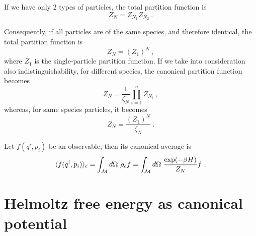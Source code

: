     \begin{example}
        If we have only $2$ types of particles, the total partition function is 
        \begin{equation*}
            Z_N = Z_{N_1} Z_{N_2} ~.
        \end{equation*}
    \end{example}
    Consequently, if all particles are of the same species, and therefore identical, the total partition function is 
    \begin{equation*}
        Z_N = (Z_1)^N ~,
    \end{equation*}
    where $Z_1$ is the single-particle partition function. 
    If we take into consideration also indistinguishability, for different species, the canonical partition function becomes 
    \begin{equation*}
        Z_N = \frac{1}{\zeta_N} \prod_{i=1}^{n} Z_{N_i} ~,
    \end{equation*}
    whereas, for same species particles, it becomes
    \begin{equation*}
        Z_N = \frac{(Z_1)^N}{\zeta_N} ~.
    \end{equation*}
    
    Let $f(q^i, p_i)$ be an observable, then its canonical average is 
    \begin{equation}\label{c:av}
        \langle f(q^i, p_i)\rangle_{c} = \int_{\mathcal M} d\Omega ~ \rho_{c} f = \int_{\mathcal M} d\Omega ~ \frac{\exp (-\beta H)}{Z_N} f ~.
    \end{equation}

\section{Helmoltz free energy as canonical potential}

